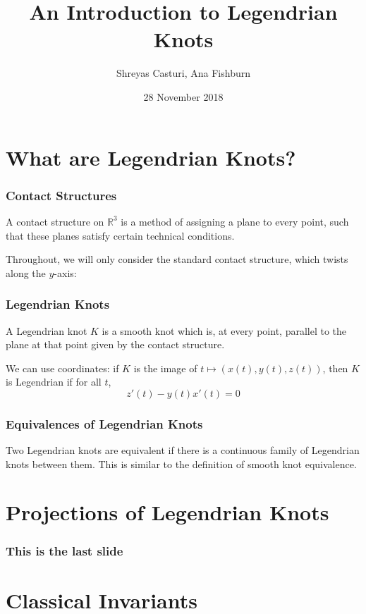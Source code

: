 \documentclass{beamer}
\newcommand{\R}{\mathbb{R}}
\begin{document}
\title{An Introduction to Legendrian Knots}
\author{Shreyas Casturi, Ana Fishburn}
\date{28 November 2018}

\frame{\titlepage}

\section[Intro]{What are Legendrian Knots?}

\begin{frame}
    \frametitle{Contact Structures}
    \begin{definition}
    A \alert{contact structure} on $\R^3$ is a method of assigning a plane
    to every point, such that these planes satisfy certain technical conditions.
    \end{definition}

    Throughout, we will only consider the \alert{standard contact structure}, which
    twists along the $y$-axis:
\end{frame}

\begin{frame}
\frametitle{Legendrian Knots}
    \begin{definition}
    A \alert{Legendrian knot} $K$ is a smooth knot which is, at every point, parallel to the
    plane at that point given by the contact structure.
    \end{definition}

    We can use coordinates: if $K$ is the image of $t \mapsto (x(t),y(t),z(t))$, then $K$
    is Legendrian if for all $t$,
    \[ z'(t) - y(t)x'(t) = 0 \]
\end{frame}

\begin{frame}
    \frametitle{Equivalences of Legendrian Knots}
    Two Legendrian knots are equivalent if there is a continuous family of Legendrian
    knots between them. This is similar to the definition of smooth knot equivalence.
\end{frame}

\section[Proj]{Projections of Legendrian Knots}

\begin{frame}
\frametitle{This is the last slide}
\end{frame}

\section{Classical Invariants}
\end{document}
